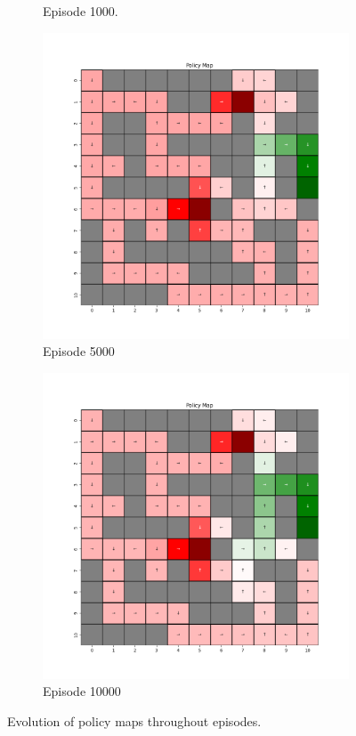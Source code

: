 \documentclass{assignment}
\begin{document}
\begin{figure}[H]
\begin{subfigure}{0.3\textwidth}
    \caption{Episode 1000.}
    \end{subfigure}\hfill
    \begin{subfigure}{0.3\textwidth}
        \includegraphics[width=\textwidth]{figures/policy_td/alpha_sweep/policy_alpha_0.001_gamma_0.95_epsilon_0.2_iteration_5000.png}
    \caption{Episode 5000}
    \end{subfigure}\hfill
    \begin{subfigure}{0.3\textwidth}
        \includegraphics[width=\textwidth]{figures/policy_td/alpha_sweep/policy_alpha_0.001_gamma_0.95_epsilon_0.2_iteration_10000.png}
    \caption{Episode 10000}
    \end{subfigure}
    \caption{Evolution of policy maps throughout episodes.}
    \label{fig:alpha_0.001_td_learning_policy}
\end{figure}
\end{document}
